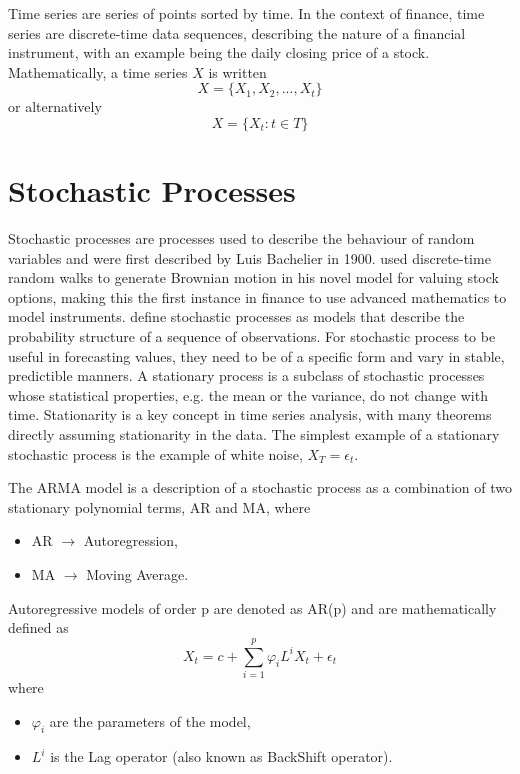 Time series are series of points sorted by time. In the context of finance, time series are discrete-time data sequences, describing the nature of a financial instrument, with an example being the daily closing price of a stock. Mathematically, a time series $X$ is written
\begin{equation}
    X = \{X_1, X_2, ..., X_t\} 
\end{equation}
or alternatively
\begin{equation}
    X = \{X_t : t \in T\}
\end{equation}

\section{Stochastic Processes}
Stochastic processes are processes used to describe the behaviour of random variables and were first described by Luis Bachelier in 1900. \citeauthor{bachelier} used discrete-time random walks to generate Brownian motion in his novel model for valuing stock options, making this the first instance in finance to use advanced mathematics to model instruments. \citeauthor{box_jenkins} define stochastic processes as models that describe the probability structure of a sequence of observations. For stochastic process to be useful in forecasting values, they need to be of a specific form and vary in stable, predictible manners. A stationary process is a subclass of stochastic processes whose statistical properties, e.g. the mean or the variance, do not change with time. Stationarity is a key concept in time series analysis, with many theorems directly assuming stationarity in the data. The simplest example of a stationary stochastic process is the example of white noise, $X_T = \epsilon_t$.

The ARMA model is a description of a stochastic process as a combination of two stationary polynomial terms, AR and MA, 
where

\begin{itemize}[nosep]
    \item[] AR $\rightarrow$ Autoregression,
    \item[] MA $\rightarrow$ Moving Average.
\end{itemize}

Autoregressive models of order p are denoted as AR(p) and are mathematically defined as
\begin{equation}
    X_t = c + \sum\limits_{i=1}^{p} \varphi_i L^i X_t + \epsilon_t
\end{equation}
where
\begin{itemize}[nosep]
    \item[] $\varphi_i$ are the parameters of the model,
    \item[] $L^i$ is the Lag operator (also known as BackShift operator).
\end{itemize}

